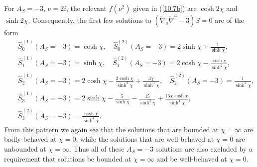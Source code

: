 For $A_S=-3$, $\nu=2i$, the relevant $f(\nu^2)$ given in (\ref{10.7b}) are $\cosh 2\chi$ and $\sinh 2\chi$. Consequently, the first few solutions  to $(\tilde{\nabla}_a\tilde{\nabla}^a-3)S=0$ are of the form
%
\begin{eqnarray}
&&\hat{S}^{(1)}_0(A_S=-3)=\cosh\chi,\quad \hat{S}^{(2)}_0(A_S=-3)=2\sinh\chi+\frac{1}{\sinh\chi},
\nonumber\\
&&\hat{S}^{(1)}_1(A_S=-3)=\sinh\chi,\quad \hat{S}^{(2)}_1(A_S=-3)=2\cosh\chi-\frac{\cosh\chi}{\sinh^2\chi},
\nonumber\\
&&\hat{S}^{(1)}_2(A_S=-3)=2\cosh\chi-\frac{3\cosh\chi}{\sinh^2\chi}+\frac{3\chi}{\sinh^3\chi},\quad \hat{S}^{(2)}_2(A_S=-3)=\frac{1}{\sinh^3\chi},
\nonumber\\
&&\hat{S}^{(1)}_3(A_S=-3)=2\sinh\chi-\frac{5}{\sinh\chi}-\frac{15}{\sinh^3\chi}+\frac{15\chi\cosh\chi}{\sinh^4\chi},
\nonumber\\
&& \hat{S}^{(2)}_3(A_S=-3)=\frac{\cosh\chi}{\sinh^4\chi}.
\label{10.12b}
\end{eqnarray}
%
From this pattern we again see that the solutions that are bounded at $\chi=\infty$ are badly-behaved at $\chi=0$, while the solutions that are  well-behaved at $\chi=0$ are unbounded at $\chi=\infty$. Thus all of these $A_S=-3$ solutions are also excluded by a requirement that solutions be  bounded at $\chi=\infty$ and be well-behaved at $\chi=0$.

